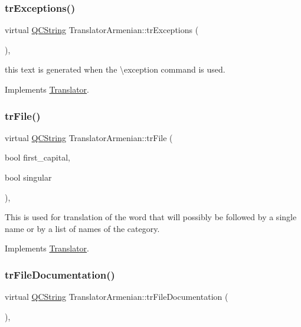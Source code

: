 \subsubsection{\texorpdfstring{trExceptions()}{trExceptions()}}
{\footnotesize\ttfamily virtual \mbox{\hyperlink{class_q_c_string}{Q\+C\+String}} Translator\+Armenian\+::tr\+Exceptions (\begin{DoxyParamCaption}{ }\end{DoxyParamCaption})\hspace{0.3cm}{\ttfamily [inline]}, {\ttfamily [virtual]}}

this text is generated when the \textbackslash{}exception command is used. 

Implements \mbox{\hyperlink{class_translator}{Translator}}.

\mbox{\label{class_translator_armenian_a7e3e87f15d09a0ed80aa8f5382f75eb0}} 
\subsubsection{\texorpdfstring{trFile()}{trFile()}}
{\footnotesize\ttfamily virtual \mbox{\hyperlink{class_q_c_string}{Q\+C\+String}} Translator\+Armenian\+::tr\+File (\begin{DoxyParamCaption}\item[{bool}]{first\+\_\+capital,  }\item[{bool}]{singular }\end{DoxyParamCaption})\hspace{0.3cm}{\ttfamily [inline]}, {\ttfamily [virtual]}}

This is used for translation of the word that will possibly be followed by a single name or by a list of names of the category. 

Implements \mbox{\hyperlink{class_translator}{Translator}}.

\mbox{\label{class_translator_armenian_ae6c23769db9fc483913888c566c39d55}} 
\subsubsection{\texorpdfstring{trFileDocumentation()}{trFileDocumentation()}}
{\footnotesize\ttfamily virtual \mbox{\hyperlink{class_q_c_string}{Q\+C\+String}} Translator\+Armenian\+::tr\+File\+Documentation (\begin{DoxyParamCaption}{ }\end{DoxyParamCaption})\hspace{0.3cm}{\ttfamily [inline]}, {\ttfamily [virtual]}}

